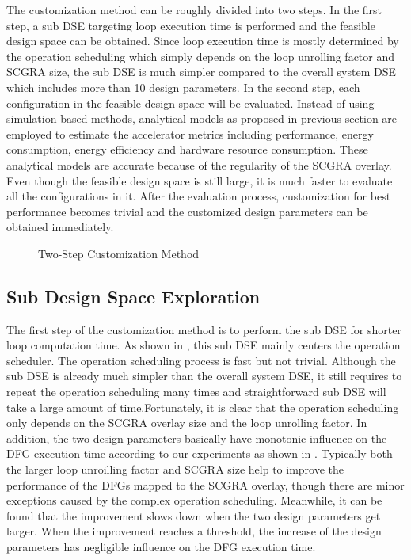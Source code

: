 The customization method can be roughly divided into two steps. In the first step, a sub DSE targeting loop execution time is performed and the feasible design space can be obtained. Since loop execution time is mostly determined by the operation scheduling which simply depends on the loop unrolling factor and SCGRA size, the sub DSE is much simpler compared to the overall system DSE which includes more than 10 design parameters. In the second step, each configuration in the feasible design space will be evaluated. Instead of using simulation based methods, analytical models as proposed in previous section are employed to estimate the accelerator metrics including performance, energy consumption, energy efficiency and hardware resource consumption. These analytical models are accurate because of the regularity of the SCGRA overlay. Even though the feasible design space is still large, it is much faster to evaluate all the configurations in it. After the evaluation process, customization for best performance becomes trivial and the customized design parameters can be obtained immediately.

\begin{figure}[t]
\caption{Two-Step Customization Method}
\label{fig:customization-framework}
\end{figure}

\subsection{Sub Design Space Exploration}
The first step of the customization method is to perform the sub DSE for shorter loop computation time. As shown in , this sub DSE mainly centers the operation scheduler. The operation scheduling process is fast but not trivial. Although the sub DSE is already much simpler than the overall system DSE, it still requires to repeat the operation scheduling many times and straightforward sub DSE will take a large amount of time.Fortunately, it is clear that the operation scheduling only depends on the SCGRA overlay size and the loop unrolling factor. In addition, the two design parameters basically have monotonic influence on the DFG execution time according to our experiments as shown in . Typically both the larger loop unroilling factor and SCGRA size help to improve the performance of the DFGs mapped to the SCGRA overlay, though there are minor exceptions caused by the complex operation scheduling. Meanwhile, it can be found that the improvement slows down when the two design parameters get larger. When the improvement reaches a threshold, the increase of the design parameters has negligible influence on the DFG execution time. 


